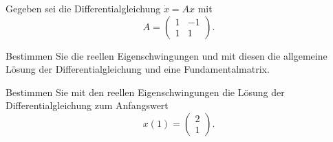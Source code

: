 \begin{Problem}
	Gegeben sei die Differentialgleichung $\dot{x} = Ax$ mit 
	\[
	A = \begin{pmatrix}
		1 & -1 \\
		1 & 1
	\end{pmatrix}.
	\]
	
	\begin{parts}
		\item Bestimmen Sie die reellen Eigenschwingungen und mit diesen die allgemeine Lösung der Differentialgleichung und eine Fundamentalmatrix.
		\item Bestimmen Sie mit den reellen Eigenschwingungen die Lösung der Differentialgleichung zum Anfangswert 
		\[
		x(1) = \begin{pmatrix}
			2 \\
			1
		\end{pmatrix}.
		\]
	\end{parts}
\end{Problem}

